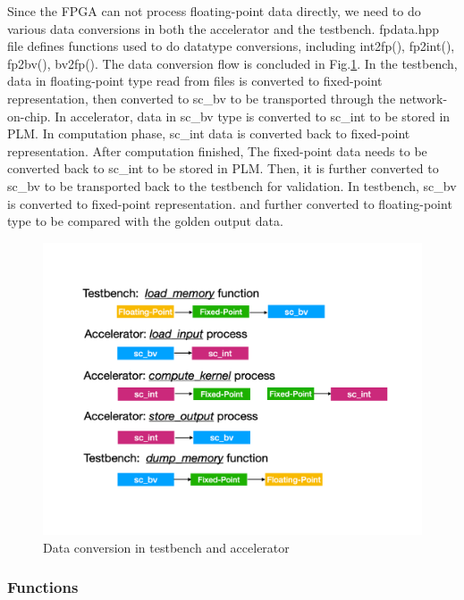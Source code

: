 Since the FPGA can not process floating-point data directly, we need to do
various data conversions in both the accelerator and the testbench. fpdata.hpp
file defines functions used to do datatype conversions, including int2fp(),
fp2int(), fp2bv(), bv2fp(). The data conversion flow is concluded in
Fig.\ref{fig-data-convert}. In the testbench, data in floating-point type read
from files is converted to fixed-point representation, then converted to sc\_bv
to be transported through the network-on-chip. In accelerator, data in sc\_bv
type is converted to sc\_int to be stored in PLM. In computation phase, sc\_int
data is converted back to fixed-point representation. After computation
finished, The fixed-point data needs to be converted back to sc\_int to be
stored in PLM. Then, it is further converted to sc\_bv to be transported back to
the testbench for validation. In testbench, sc\_bv is converted to fixed-point
representation. and further converted to floating-point type to be compared with
the golden output data. \\

\begin{figure}[t]
\centering
\captionsetup{justification=centering, format=hang}
\includegraphics[width=\columnwidth]{figures/data-conversion}
\caption{Data conversion in testbench and accelerator}
\label{fig-data-convert}
\end{figure}



\subsubsection{Functions}

